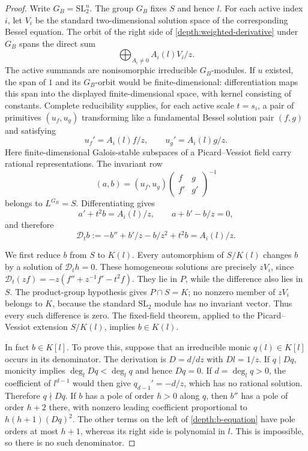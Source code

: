 \documentclass[11pt]{article}
\theoremstyle{definition}
\theoremstyle{remark}
\begin{document}
\begin{proof}
Write $G_B=\mathrm{SL}_2^n$.  The group $G_B$ fixes $S$ and hence
$l$.  For each active index $i$, let $V_i$ be the standard
two-dimensional solution space of the corresponding Bessel equation.
The orbit of the right side of \eqref{depth:weighted-derivative}
under $G_B$ spans the direct sum
\[
       \bigoplus_{A_i\ne0} A_i(l)V_i/z.
\]
The active summands are nonisomorphic irreducible $G_B$-modules.
If $u$ existed, the span of $1$ and its $G_B$-orbit would be
finite-dimensional: differentiation maps this span into the displayed
finite-dimensional space, with kernel consisting of constants.
Complete reducibility supplies, for each active scale $t=s_i$, a
pair of primitives $(u_f,u_g)$ transforming like a fundamental Bessel
solution pair $(f,g)$ and satisfying
\[
             u_f'=A_i(l)f/z,\qquad u_g'=A_i(l)g/z.
\]
Here finite-dimensional Galois-stable subspaces of a Picard--Vessiot
field carry rational representations.  The invariant row
\[
 (a,b)=(u_f,u_g)
       \begin{pmatrix}f&g\\f'&g'\end{pmatrix}^{-1}
\]
belongs to $L^{G_B}=S$.  Differentiating gives
\[
 a'+t^2b=A_i(l)/z,\qquad a+b'-b/z=0,
\]
and therefore
\begin{equation}\label{depth:b-equation}
 \mathcal D_t b:=-b''+b'/z-b/z^2+t^2b=A_i(l)/z.
\end{equation}

We first reduce $b$ from $S$ to $K(l)$.  Every automorphism of
$S/K(l)$ changes $b$ by a solution of $\mathcal D_t h=0$.
These homogeneous solutions are precisely $zV_i$, since
$\mathcal D_t(zf)=-z(f''+z^{-1}f'-t^2f)$.
They lie in $P$, while the difference also lies in $S$.
The product-group hypothesis gives $P\cap S=K$; no nonzero member
of $zV_i$ belongs to $K$, because the standard $\mathrm{SL}_2$
module has no invariant vector.  Thus every such difference is zero.
The fixed-field theorem, applied to the Picard--Vessiot extension
$S/K(l)$, implies $b\in K(l)$.

In fact $b\in K[l]$.  To prove this, suppose that an irreducible
monic $q(l)\in K[l]$ occurs in its denominator.  The derivation is
$D=d/dz$ with $Dl=1/z$.  If $q\mid Dq$, monicity implies
$\deg_l Dq<\deg_l q$ and hence $Dq=0$.  If $d=\deg_l q>0$,
the coefficient of $l^{d-1}$ would then give
$q_{d-1}'=-d/z$, which has no rational solution.  Therefore
$q\nmid Dq$.  If $b$ has a pole of order $h>0$ along $q$, then
$b''$ has a pole of order $h+2$ there, with nonzero leading
coefficient proportional to $h(h+1)(Dq)^2$.  The other terms on
the left of \eqref{depth:b-equation} have pole orders at most
$h+1$, whereas its right side is polynomial in $l$.  This is
impossible, so there is no such denominator.


\end{proof}
\end{document}
